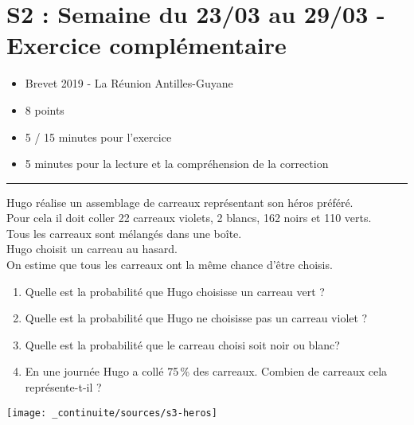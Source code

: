 \documentclass[12pt]{article}
\newcommand{\horrule}[1]{\rule{\linewidth}{#1}} %
\begin{document}

\newtheorem{Definition}{Définition}
\newtheorem{Theorem}{Théorème}
\newtheorem{Proposition}{Propriété}

\renewcommand{\labelitemi}{$\bullet$}
\renewcommand{\labelitemii}{$\circ$}

\setlength{\columnseprule}{1pt}

\section*{S2 : Semaine du 23/03 au 29/03 - Exercice complémentaire}

\begin{itemize}
  \item Brevet 2019 - La Réunion Antilles-Guyane
  \item 8 points
  \item 5 / 15 minutes pour l'exercice
  \item 5 minutes pour la lecture et la compréhension de la correction
\end{itemize}

 \horrule{2px}

\parbox{0.8\linewidth}{
    Hugo réalise un assemblage de carreaux représentant son héros préféré. \\
    Pour cela il doit coller 22 carreaux violets, 2 blancs, 162 noirs et 110 verts.\\
    Tous les carreaux sont mélangés dans une boîte.\\
    Hugo choisit un carreau au hasard.\\
    On estime que tous les carreaux ont la même chance d'être choisis.\\

    \medskip
    \begin{enumerate}
    \item Quelle est la probabilité que Hugo choisisse un carreau vert ?
    \item Quelle est la probabilité que Hugo ne choisisse pas un carreau violet ?
    \item Quelle est la probabilité que le carreau choisi soit noir ou blanc?
    \item En une journée Hugo a collé 75\,\% des carreaux. Combien de carreaux cela représente-t-il ?
    \end{enumerate}
    }
\hfill \parbox{0.18\linewidth}{
    \texttt{[image: \_continuite/sources/s3-heros]}
    }
\end{document}
